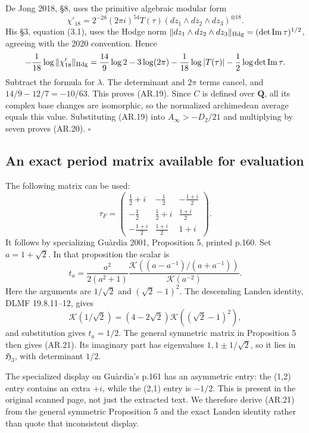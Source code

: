 De Jong 2018, §8, uses the primitive algebraic modular form \[
\chi'_{18}=2^{-28}(2\pi i)^{54}T(\tau)
           (dz_1\wedge dz_2\wedge dz_3)^{\otimes18}.
\] His §3, equation (3.1), uses the Hodge norm
\(\|dz_1\wedge dz_2\wedge dz_3\|_{\rm Hdg}
=(\det\operatorname{Im}\tau)^{1/2}\), agreeing with the 2020 convention.
Hence \[
-\frac1{18}\log\|\chi'_{18}\|_{\rm Hdg}
=\frac{14}{9}\log2-3\log(2\pi)
 -\frac1{18}\log|T(\tau)|
 -\frac12\log\det\operatorname{Im}\tau.
\] Subtract the formula for \(\lambda\). The determinant and \(2\pi\)
terms cancel, and \(14/9-12/7=-10/63\). This proves (AR.19). Since \(C\)
is defined over \(\mathbf Q\), all its complex base changes are
isomorphic, so the normalized archimedean average equals this value.
Substituting (AR.19) into \(A_\infty>-D_2/21\) and multiplying by seven
proves (AR.20). \(\square\)

\subsection{An exact period matrix available for
evaluation}\label{an-exact-period-matrix-available-for-evaluation}

The following matrix can be used: \[
\tau_F=
\begin{pmatrix}
\frac12+i&-\frac12&-\frac{1+i}{2}\\
-\frac12&\frac12+i&\frac{1+i}{2}\\
-\frac{1+i}{2}&\frac{1+i}{2}&1+i
\end{pmatrix}.
\tag{AR.21}
\] It follows by specializing Guàrdia 2001, Proposition 5, printed
p.160. Set \(a=1+\sqrt2\). In that proposition the scalar is \[
t_a=\frac{a^2}{2(a^2+1)}
\frac{\mathcal K((a-a^{-1})/(a+a^{-1}))}{\mathcal K(a^{-2})}.
\] Here the arguments are \(1/\sqrt2\) and \((\sqrt2-1)^2\). The
descending Landen identity, DLMF 19.8.11--12, gives \[
\mathcal K(1/\sqrt2)
=(4-2\sqrt2)\mathcal K((\sqrt2-1)^2),
\] and substitution gives \(t_a=1/2\). The general symmetric matrix in
Proposition 5 then gives (AR.21). Its imaginary part has eigenvalues
\(1,1\pm1/\sqrt2\), so it lies in \(\mathfrak H_3\), with determinant
\(1/2\).

The specialized display on Guàrdia's p.161 has an asymmetric entry: the
(1,2) entry contains an extra \(+i\), while the (2,1) entry is \(-1/2\).
This is present in the original scanned page, not just the extracted
text. We therefore derive (AR.21) from the general symmetric Proposition
5 and the exact Landen identity rather than quote that inconsistent
display.

